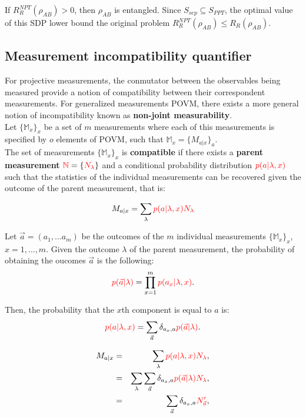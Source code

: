 \documentclass[12pt, letterpaper]{article}
\begin{document}
If $R_R^{NPT}(\rho_{AB}) > 0$, then $\rho_{AB}$ is entangled. Since $S_{sep} \subseteq S_{PPT}$, the optimal value of this SDP lower bound the original problem $R_R^{NPT}(\rho_{AB}) \leq R_R(\rho_{AB})$.


\subsection{Measurement incompatibility quantifier}

For projective measurements, the conmutator between the observables being measured provide a notion of compatibility between their correspondent measurements. For generalized measurements POVM, there exists a more general notion of incompatibility known as \textbf{non-joint measurability}.\\

Let $\{ \mathbb{M}_x \}_x$ be a set of $m$ measurements where each of this measurements is specified by $o$ elements of POVM, such that $\mathbb{M}_x = \{ M_{a|x} \}_a$.\\

The set of measurements $\{ \mathbb{M}_x \}_x$ is \textbf{compatible} if there exists a \textbf{parent measurement} $\textcolor{red}{\mathbb{N}} = \{ \textcolor{red}{N_\lambda}\}$ and a conditional probability distribution $\textcolor{red}{p(a|\lambda, x)}$ such that the statistics of the individual measurements can be recovered given the outcome of the parent measurement, that is:

\[
M_{a|x} = \sum_\lambda \textcolor{red}{p(a|\lambda, x)N_\lambda}
\]

Let $\vec{a} = \left(a_1, \dots a_m \right)$ be the outcomes of the $m$ individual measurements $\{ \mathbb{M}_x\}_x$, $x=1, \dots, m$. Given the outcome $\lambda$ of the parent measurement, the probability of obtaining the oucomes $\vec{a}$ is the following:
\[
\textcolor{red}{p(\vec{a}|\lambda)} = \prod_{x=1}^{m}\textcolor{red}{p(a_x | \lambda, x)}.
\]

Then, the probability that the $x$th component is equal to $a$ is:
\[
\textcolor{red}{p(a|\lambda, x)} = \sum_{\vec{a}} \delta_{a_x, a}\textcolor{red}{p(\vec{a}|\lambda)}.
\]

\begin{eqnarray*}
    M_{a|x} &=& \sum_\lambda \textcolor{red}{p(a|\lambda, x)N_\lambda}, \\
    &=& \sum_{\lambda} \sum_{\vec{a}} \delta_{a_x, a}\textcolor{red}{p(\vec{a}|\lambda) N_\lambda} ,\\
    &=& \sum_{\vec{a}} \delta_{a_x, a}\textcolor{red}{N'_{\vec{a}}},
\end{eqnarray*}
\end{document}
